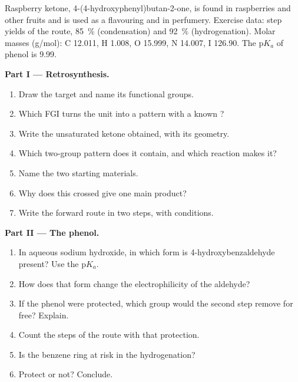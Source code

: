 \begin{problem}
\label{pb:b2:retrosynthesis:1}
Raspberry ketone, 4-(4-hydroxyphenyl)butan-2-one, is found in raspberries and other fruits and is used
as a flavouring and in perfumery. Exercise data: step yields of the  route, 85~\% (condensation)
and 92~\% (hydrogenation). Molar masses (\unit{g/mol}): C 12.011, H 1.008, O 15.999, N 14.007,
I 126.90. The $\mathrm pK_a$ of phenol is 9.99.

\medskip
\noindent\textbf{Part I --- Retrosynthesis.}
\begin{enumerate}
  \item Draw the target and name its functional groups.
  \item Which FGI turns the  unit into a pattern with a known ?
  \item Write the unsaturated ketone obtained, with its geometry.
  \item Which two-group pattern does it contain, and which reaction makes it?
  \item Name the two starting materials.
  \item Why does this crossed  give one main product?
  \item Write the forward route in two steps, with conditions.
\end{enumerate}

\medskip
\noindent\textbf{Part II --- The phenol.}
\begin{enumerate}[resume]
  \item In aqueous sodium hydroxide, in which form is 4-hydroxybenzaldehyde present? Use the
        $\mathrm pK_a$.
  \item How does that form change the electrophilicity of the aldehyde?
  \item If the phenol were protected, which group would the second step remove for free? Explain.
  \item Count the steps of the route with that protection.
  \item Is the benzene ring at risk in the hydrogenation?
  \item Protect or not? Conclude.
\end{enumerate}


\end{problem}
